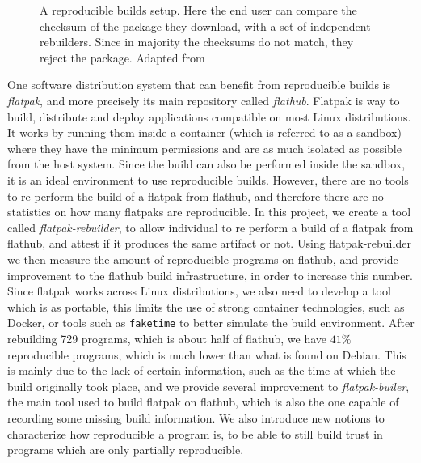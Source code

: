 \documentclass[a4paper,11pt,oneside]{report}
\theoremstyle{definition}
\newcommand{\sysname}{flatpak-rebuilder\xspace}
\newcommand{\rb}{reproducible builds\xspace}
\newcommand{\fp}{flatpak\xspace}
\newcommand{\Fp}{Flatpak\xspace}
\newcommand{\fh}{flathub\xspace}
\newcommand{\fb}{flatpak-builer\xspace}
\begin{document}
\begin{figure}[h]
    \caption{A reproducible builds setup. Here the end user can compare the
    checksum of the package they download, with a set of independent
    rebuilders. Since in majority the checksums do not match, they reject the
    package. Adapted from \cite{DBLP:journals/corr/abs-2104-06020}}
    \label{fig:reprobuild}
\end{figure}

One software distribution system that can benefit from \rb is \emph{\fp}, and
more precisely its main repository called \emph{\fh}. \Fp is way to build,
distribute and deploy applications compatible on most Linux distributions. It
works by running them inside a container (which is referred to as a sandbox)
where they have the minimum permissions and are as much isolated as possible
from the host system. Since the build can also be performed inside the sandbox,
it is an ideal environment to use \rb. However, there are no tools to re
perform the build of a \fp from \fh, and therefore there are no statistics on
how many flatpaks are reproducible. In this project, we create a tool called
\emph{\sysname}, to allow individual to re perform a build of a \fp from \fh,
and attest if it produces the same artifact or not. Using \sysname we then
measure the amount of reproducible programs on \fh, and provide improvement to
the \fh build infrastructure, in order to increase this number. Since \fp works
across Linux distributions, we also need to develop a tool which is as
portable, this limits the use of strong container technologies, such as Docker,
or tools such as \verb|faketime| to better simulate the build environment.
After rebuilding 729 programs, which is about half of \fh, we have $41\%$
reproducible programs, which is much lower than what is found on Debian. This
is mainly due to the lack of certain information, such as the time at which the
build originally took place, and we provide several improvement to \emph{\fb},
the main tool used to build \fp on \fh, which is also the one capable of
recording some missing build information. We also introduce new notions to
characterize how reproducible a program is, to be able to still build trust in
programs which are only partially reproducible.
\end{document}
